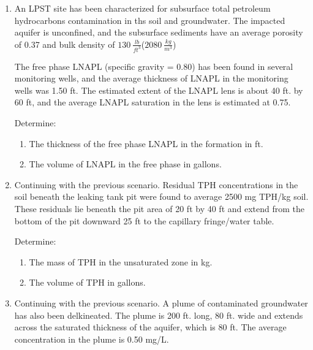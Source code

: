 \documentclass[12pt]{article}
\begin{document}
\begin{enumerate}

\clearpage
\item  An LPST site has been characterized for subsurface total petroleum hydrocarbons contamination in ths soil and groundwater. The impacted aquifer is unconfined, and the subsurface sediments have an average porosity of 0.37 and bulk density of $130~\frac{lb}{ft^3}$($2080~\frac{kg}{m^3}$)

The free phase LNAPL (specific gravity = 0.80) has been found in several monitoring wells, and the average thickness of LNAPL in the monitoring wells was 1.50 ft.  The estimated extent of the LNAPL lens is about 40 ft. by 60 ft, and the average LNAPL saturation in the lens is estimated at 0.75.

Determine:
\begin{enumerate}
\item The thickness of the free phase LNAPL in the formation in ft.
\item The volume of LNAPL in the free phase in gallons.
\end{enumerate}

\item Continuing with the previous scenario. Residual TPH concentrations in the soil beneath the leaking tank pit were found to average 2500 mg TPH/kg soil.  These residuals lie beneath the pit area of 20 ft by 40 ft and extend from the bottom of the pit downward 25 ft to the capillary fringe/water table.

Determine:
\begin{enumerate}
\item The mass of TPH in the unsaturated zone in kg.
\item The volume of TPH in gallons.
\end{enumerate}

\item Continuing with the previous scenario. A plume of contaminated groundwater has also been delkineated.  The plume is 200 ft. long, 80 ft. wide and extends across the saturated thickness of the aquifer, which is 80 ft.  The average concentration in the plume is 0.50 mg/L.


\end{enumerate}
\end{document}
